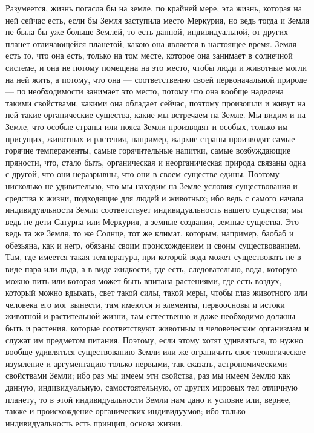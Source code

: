 \documentclass[12pt]{article}
\begin{document}
Разумеется, жизнь погасла бы на земле, по крайней мере, эта жизнь, которая на ней сейчас есть, если бы Земля заступила место Меркурия, но ведь тогда и Земля не была бы уже больше Землей, то есть данной, индивидуальной, от других планет отличающейся планетой, какою она является в настоящее время. Земля есть то, что она есть, только на том месте, которое она занимает в солнечной системе, и она не потому помещена на это место, чтобы люди и животные могли на ней жить, а потому, что она --- соответственно своей первоначальной природе --- по необходимости занимает это место, потому что она вообще наделена такими свойствами, какими она обладает сейчас, поэтому произошли и живут на ней такие органические существа, какие мы встречаем на Земле. Мы видим и на Земле, что особые страны или пояса Земли производят и особых, только им присущих, животных и растения, например, жаркие страны производят самые горячие темпераменты, самые горячительные напитки, самые возбуждающие пряности, что, стало быть, органическая и неорганическая природа связаны одна с другой, что они неразрывны, что они в своем существе едины. Поэтому нисколько не удивительно, что мы находим на Земле условия существования и средства к жизни, подходящие для людей и животных; ибо ведь с самого начала индивидуальности Земли соответствует индивидуальность нашего существа; мы ведь не дети Сатурна или Меркурия, а земные создания, земные существа. Это ведь та же Земля, то же Солнце, тот же климат, которым, например, баобаб и обезьяна, как и негр, обязаны своим происхождением и своим существованием. Там, где имеется такая температура, при которой вода может существовать не в виде пара или льда, а в виде жидкости, где есть, следовательно, вода, которую можно пить или которая может быть впитана растениями, где есть воздух, который можно вдыхать, свет такой силы, такой меры, чтобы глаз животного или человека его мог вынести, там имеются и элементы, первоосновы и истоки животной и растительной жизни, там естественно и даже необходимо должны быть и растения, которые соответствуют животным и человеческим организмам и служат им предметом питания. Поэтому, если этому хотят удивляться, то нужно вообще удивляться существованию Земли или же ограничить свое теологическое изумление и аргументацию только первыми, так сказать, астрономическими свойствами Земли; ибо раз мы имеем эти свойства, раз мы имеем Землю как данную, индивидуальную, самостоятельную, от других мировых тел отличную планету, то в этой индивидуальности Земли нам дано и условие или, вернее, также и происхождение органических индивидуумов; ибо только индивидуальность есть принцип, основа жизни. 
\end{document}

